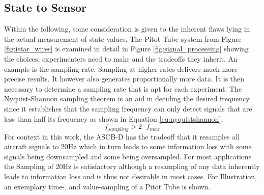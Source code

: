 \subsection{State to Sensor}
Within the following, some consideration is given to the inherent flaws lying in the actual measurement of state values. The Pitot Tube system from Figure \ref{fig:istar_wires} is examined in detail in Figure \ref{fig:signal_processing} showing the choices, experimenters need to make and the tradeoffs they inherit. An example is the sampling rate. Sampling at higher rates delivers much more precise results. It however also generates proportionally more data. It is then necessary to determine a sampling rate that is apt for each experiment. The Nyquist-Shannon sampling theorem is an aid in deciding the desired frequency since it establishes that the sampling frequency can only detect signals that are less than half its frequency as shown in Equation \ref{eq:nyquistshannon}. \cite{smith_scientist_1999}
\begin{equation}
    f_{sampling} > 2 \cdot f_{max}
    \label{eq:nyquistshannon}
\end{equation}
For context in this work, the ASCB-D has the tradeoff that it resamples all aircraft signals to 20Hz which in turn leads to some information loss with some signals being downsampled and some being oversampled. For most applications the Sampling of 20Hz is satisfactory although a resampling of any data inherently leads to information loss and is thus not desirable in most cases. For Illustration, an exemplary time-, and value-sampling of a Pitot Tube is shown.
